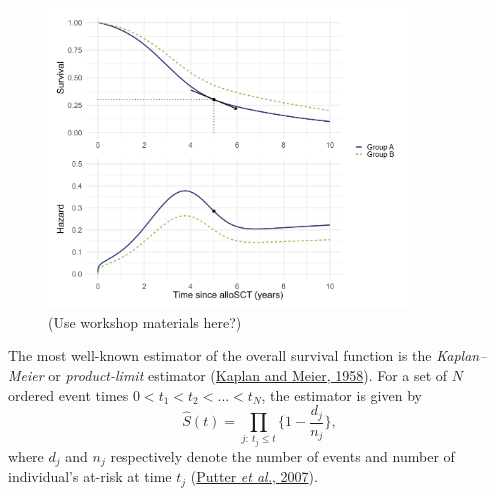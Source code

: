 \documentclass[
  letterpaper,
  DIV=11,
  numbers=noendperiod]{scrreprt}
\begin{document}
\begin{figure}

{\centering \includegraphics[width=0.85\textwidth,height=\textheight]{figures/haz_surv_panels.png}

}

\caption{\label{fig-intro-haz}(Use workshop materials here?)}

\end{figure}

The most well-known estimator of the overall survival function is the
\emph{Kaplan--Meier} or \emph{product-limit} estimator
(\protect\hyperlink{ref-kaplanNonparametricEstimationIncomplete1958}{Kaplan
and Meier, 1958}). For a set of \(N\) ordered event times
\(0 < t_1 < t_2 < \dots < t_N\), the estimator is given by \[
\hat{S}(t) = \prod_{j:\ t_j \leq t} \bigg\{1 - \frac{d_j}{n_j}\bigg\},
\] where \(d_j\) and \(n_j\) respectively denote the number of events
and number of individual's at-risk at time \(t_j\)
(\protect\hyperlink{ref-putterTutorialBiostatisticsCompeting2007}{Putter
\emph{et al.}, 2007}).
\end{document}

